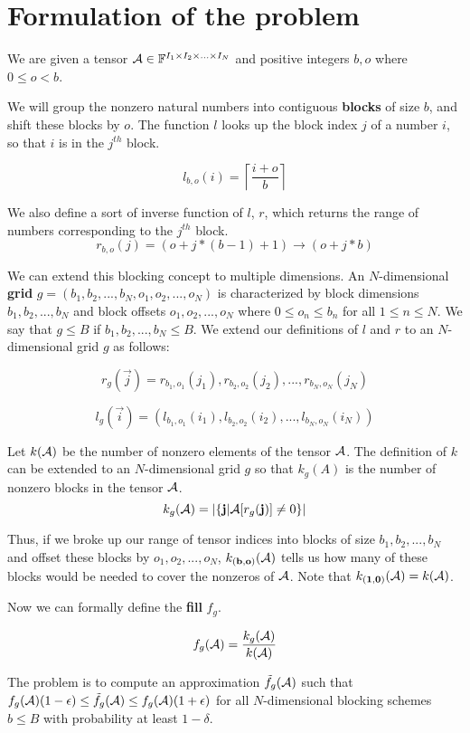 
\section{Formulation of the problem}
    We are given a tensor $\mathbf{\mathcal{A}} \in \mathbb{F}^{I_1 \times I_2 \times ... \times I_N}$ and positive integers $b, o$ where $0 \leq o < b$.

    We will group the nonzero natural numbers into contiguous \textbf{blocks} of size $b$, and shift these blocks by $o$. The function $l$ looks up the block index $j$ of a number $i$, so that $i$ is in the $j^{th}$ block.

    \[
      l_{b, o}(i) = \left\lceil\frac{i + o}{b}\right\rceil
    \]

    We also define a sort of inverse function of $l$, $r$, which returns the range of numbers corresponding to the $j^{th}$ block.
    \[
      r_{b, o}(j) = (o + j * (b - 1) + 1) \to (o + j * b)
    \]

    We can extend this blocking concept to multiple dimensions. An $N$-dimensional \textbf{grid} $g = (b_1, b_2, ..., b_N, o_1, o_2, ..., o_N)$ is characterized by block dimensions $b_1, b_2, ..., b_N$ and block offsets $o_1, o_2, ..., o_N$ where $0 \leq o_n \leq b_n$ for all $1 \leq n \leq N$. We say that $g \leq B$ if $b_1, b_2, ..., b_N \leq B$. We extend our definitions of $l$ and $r$ to an $N$-dimensional grid $g$ as follows:

    \[
      r_g(\vec{j}) = r_{b_1, o_1}(j_1), r_{b_2, o_2}(j_2), ..., r_{b_N, o_N}(j_N)
    \]

    \[
      l_g(\vec{i}) = (l_{b_1, o_1}(i_1), l_{b_2, o_2}(i_2), ..., l_{b_N, o_N}(i_N))
    \]

    Let $k(\mathbf{\mathcal{A}})$ be the number of nonzero elements of the tensor $\mathbf{\mathcal{A}}$. The definition of $k$ can be extended to an $N$-dimensional grid $g$ so that $k_g(A)$ is the number of nonzero blocks in the tensor $\mathbf{\mathcal{A}}$.
    \[
      k_g(\mathbf{\mathcal{A}}) = \left|\{\mathbf{j} | \mathbf{\mathcal{A}}[r_g(\mathbf{j})] \neq 0\}\right|
    \]

    Thus, if we broke up our range of tensor indices into blocks of size $b_1, b_2, ..., b_N$ and offset these blocks by $o_1, o_2, ..., o_N$, $k_{(\mathbf{b}, \mathbf{o})}(\mathbf{\mathcal{A}})$ tells us how many of these blocks would be needed to cover the nonzeros of $\mathbf{\mathcal{A}}$. Note that $k_{(\mathbf{1}, \mathbf{0})}(\mathbf{\mathcal{A}}) = k(\mathbf{\mathcal{A}})$.

    Now we can formally define the \textbf{fill} $f_g$.

    \[
      f_g(\mathbf{\mathcal{A}}) = \frac{k_g(\mathbf{\mathcal{A}})}{k(\mathbf{\mathcal{A}})}
    \]

    The problem is to compute an approximation $\tilde{f}_g(\mathbf{\mathcal{A}})$ such that $f_g(\mathbf{\mathcal{A}})(1 - \epsilon) \leq \tilde{f}_g(\mathbf{\mathcal{A}}) \leq f_g(\mathbf{\mathcal{A}})(1 + \epsilon)$ for all $N$-dimensional blocking schemes $b \leq B$ with probability at least $1 - \delta$.
